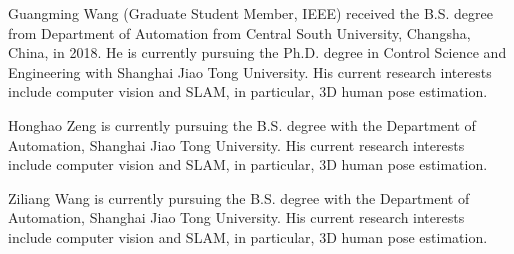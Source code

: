 \documentclass[journal]{IEEEtran}
\begin{document}
\ifCLASSOPTIONcaptionsoff
  \newpage
\fi


   


\begin{IEEEbiography}{Guangming Wang} (Graduate Student Member,
	IEEE) received the B.S. degree from Department of Automation from Central South University, Changsha, China, in 2018. He is currently pursuing the Ph.D. degree in Control Science and Engineering with Shanghai Jiao Tong University. His current research interests include computer vision and SLAM, in particular, 3D human pose estimation.
\end{IEEEbiography}
\begin{IEEEbiography}{Honghao Zeng}
is currently pursuing the B.S. degree with the Department of Automation, Shanghai Jiao Tong University. His current research interests include computer vision and SLAM, in particular, 3D human pose estimation.
\end{IEEEbiography}
\begin{IEEEbiography}{Ziliang Wang}
is currently pursuing the B.S. degree with the Department of Automation, Shanghai Jiao Tong University. His current research interests include computer vision and SLAM, in particular, 3D human pose estimation.
\end{IEEEbiography}
\end{document}
